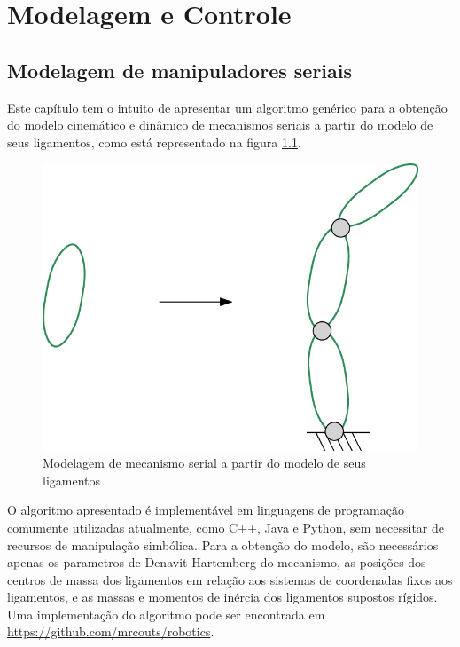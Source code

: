 \documentclass[]{politex}
\begin{document}

\part{Modelagem e Controle}
	
\chapter{Modelagem de manipuladores seriais} \label{cap:Seriais}

Este capítulo tem o intuito de apresentar um algoritmo genérico para a obtenção do modelo cinemático e dinâmico de mecanismos seriais a partir do modelo de seus ligamentos, como está representado na figura \ref{fig:AcoplamentoMecSerialFig}. 
\begin{figure}[h]
	\centering
	\includegraphics[scale=1.0]{imagens/Elo2Serial.jpg}  
	\caption{Modelagem de mecanismo serial a partir do modelo de seus ligamentos}
	\label{fig:AcoplamentoMecSerialFig}
\end{figure}

O algoritmo apresentado é implementável em linguagens de programação comumente utilizadas atualmente, como C++, Java e Python, sem necessitar de recursos de manipulação simbólica. Para a obtenção do modelo, são necessários apenas os parametros de Denavit-Hartemberg \cite{Craig, Denavit, Lipkin, Cabral} do mecanismo, as posições dos centros de massa dos ligamentos em relação aos sistemas de coordenadas fixos aos ligamentos, e as massas e momentos de inércia dos ligamentos supostos rígidos. Uma implementação do algoritmo pode ser encontrada em \url{https://github.com/mrcouts/robotics}.
\end{document}
